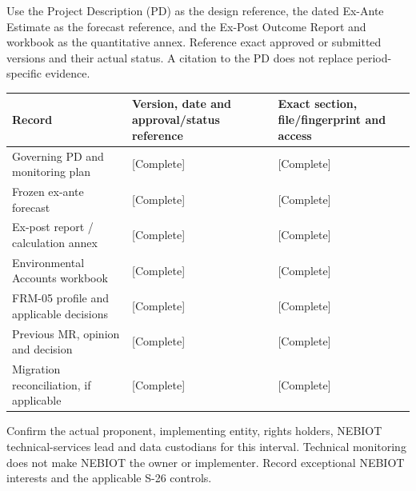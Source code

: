 Use the Project Description (PD) as the design reference, the dated Ex-Ante Estimate as the forecast reference, and the Ex-Post Outcome Report and workbook as the quantitative annex. Reference exact approved or submitted versions and their actual status. A citation to the PD does not replace period-specific evidence.\par
{}
{\sffamily\fontsize{8.6}{10.7}\selectfont\begin{longtable}{@{}P{48mm}P{61mm}P{53mm}@{}}
\toprule
\textbf{Record} & \textbf{Version, date and approval/status reference} & \textbf{Exact section, file/fingerprint and access}\\\midrule\endhead
\rule{0pt}{8mm}Governing PD and monitoring plan & [Complete] & [Complete]\\\hline
\rule{0pt}{8mm}Frozen ex-ante forecast & [Complete] & [Complete]\\\hline
\rule{0pt}{8mm}Ex-post report / calculation annex & [Complete] & [Complete]\\\hline
\rule{0pt}{8mm}Environmental Accounts workbook & [Complete] & [Complete]\\\hline
\rule{0pt}{8mm}FRM-05 profile and applicable decisions & [Complete] & [Complete]\\\hline
\rule{0pt}{8mm}Previous MR, opinion and decision & [Complete] & [Complete]\\\hline
\rule{0pt}{8mm}Migration reconciliation, if applicable & [Complete] & [Complete]\\\hline
\end{longtable}}
Confirm the actual proponent, implementing entity, rights holders, NEBIOT technical-services lead and data custodians for this interval. Technical monitoring does not make NEBIOT the owner or implementer. Record exceptional NEBIOT interests and the applicable S-26 controls.\par
{}
